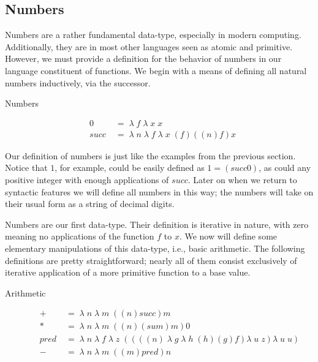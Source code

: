 \subsection{Numbers}
Numbers are a rather fundamental data-type, especially in modern computing.
Additionally, they are in most other languages seen as atomic and primitive.
However, we must provide a definition for the behavior of numbers in our language 
constituent of functions. We begin with a means of defining all natural numbers
inductively, via the successor.

Numbers
\begin{figure}[htp]
\caption{}\label{scheme}
\begin{align*}
& 0 \; &= \; \lambda \; f \; \lambda \; x \; x
\\& succ \; &= \; \lambda \; n \; \lambda \; f \; \lambda \; x \; (f)((n)f)x
\end{align*}
\end{figure}

Our definition of numbers is just like the examples from the previous section.
Notice that $1$, for example, could be easily defined as $1 = (succ 0)$, as could
any positive integer with enough applications of $succ$. Later on when we return
to syntactic features we will define all numbers in this way; the numbers will
take on their usual form as a string of decimal digits.

Numbers are our first data-type. Their definition is iterative in nature, with
zero meaning no applications of the function $f$ to $x$. We now will define some
elementary manipulations of this data-type, i.e., basic arithmetic. The following
definitions are pretty straightforward; nearly all of them consist exclusively of
iterative application of a more primitive function to a base value.

Arithmetic
\begin{figure}[htp]
\caption{}\label{scheme}
\begin{align*}
& + \; &= \; \lambda \; n \; \lambda \; m \; ((n)succ)m
\\& * \; &= \; \lambda \; n \; \lambda \; m \; ((n)(sum)m)0
\\& pred \; &= \; \lambda \; n \; \lambda \; f \; \lambda \; z \; ((((n) \; \lambda \; g \; \lambda \; h \; (h)(g)f)\lambda \; u \; z)\lambda \; u \; u)
\\& - \; &= \; \lambda \; n \; \lambda \; m \; ((m)pred)n
\end{align*}
\end{figure}

